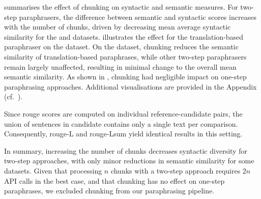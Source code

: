  summarises the effect of chunking on syntactic and semantic measures. 
For two-step paraphrasers, the difference between semantic and syntactic scores increases with the number of chunks, driven by decreasing mean average syntactic similarity for the \dataBlog{} and \dataStudent{} datasets. 
 illustrates the effect for the translation-based paraphraser on the \dataBlog{} dataset. 
On the \dataGutenberg{} dataset, chunking reduces the semantic similarity of translation-based paraphrases, while other two-step paraphrasers remain largely unaffected, resulting in minimal change to the overall mean semantic similarity. 
As shown in , chunking had negligible impact on one-step paraphrasing approaches. 
Additional visualisations are provided in the Appendix (cf.~).

Since \ac{rouge} scores are computed on individual reference-candidate pairs, the union of sentences in candidate contains only a single text per comparison. 
Consequently, \ac{rouge}-L and \ac{rouge}-Lsum yield identical results in this setting.

In summary, increasing the number of chunks decreases syntactic diversity for two-step approaches, with only minor reductions in semantic similarity for some datasets. 
Given that processing $n$ chunks with a two-step approach requires $2n$ API calls in the best case, and that chunking has no effect on one-step paraphrases, we excluded chunking from our paraphrasing pipeline.

%     

%     

